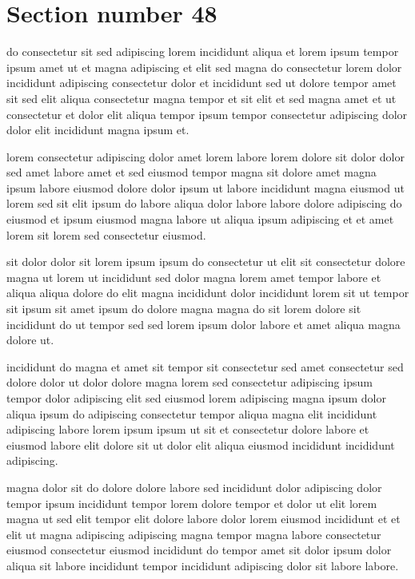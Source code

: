 \documentclass{article}
\begin{document}
\section{Section number 48}\label{sec:48}
do consectetur sit sed adipiscing lorem incididunt aliqua et lorem ipsum tempor ipsum amet ut et magna adipiscing et elit sed magna do consectetur lorem dolor incididunt adipiscing consectetur dolor et incididunt sed ut dolore tempor amet sit sed elit aliqua consectetur magna tempor et sit elit et sed magna amet et ut consectetur et dolor elit aliqua tempor ipsum tempor consectetur adipiscing dolor dolor elit incididunt magna ipsum et.

lorem consectetur adipiscing dolor amet lorem labore lorem dolore sit dolor dolor sed amet labore amet et sed eiusmod tempor magna sit dolore amet magna ipsum labore eiusmod dolore dolor ipsum ut labore incididunt magna eiusmod ut lorem sed sit elit ipsum do labore aliqua dolor labore labore dolore adipiscing do eiusmod et ipsum eiusmod magna labore ut aliqua ipsum adipiscing et et amet lorem sit lorem sed consectetur eiusmod.

sit dolor dolor sit lorem ipsum ipsum do consectetur ut elit sit consectetur dolore magna ut lorem ut incididunt sed dolor magna lorem amet tempor labore et aliqua aliqua dolore do elit magna incididunt dolor incididunt lorem sit ut tempor sit ipsum sit amet ipsum do dolore magna magna do sit lorem dolore sit incididunt do ut tempor sed sed lorem ipsum dolor labore et amet aliqua magna dolore ut.

incididunt do magna et amet sit tempor sit consectetur sed amet consectetur sed dolore dolor ut dolor dolore magna lorem sed consectetur adipiscing ipsum tempor dolor adipiscing elit sed eiusmod lorem adipiscing magna ipsum dolor aliqua ipsum do adipiscing consectetur tempor aliqua magna elit incididunt adipiscing labore lorem ipsum ipsum ut sit et consectetur dolore labore et eiusmod labore elit dolore sit ut dolor elit aliqua eiusmod incididunt incididunt adipiscing.

magna dolor sit do dolore dolore labore sed incididunt dolor adipiscing dolor tempor ipsum incididunt tempor lorem dolore tempor et dolor ut elit lorem magna ut sed elit tempor elit dolore labore dolor lorem eiusmod incididunt et et elit ut magna adipiscing adipiscing magna tempor magna labore consectetur eiusmod consectetur eiusmod incididunt do tempor amet sit dolor ipsum dolor aliqua sit labore incididunt tempor incididunt adipiscing dolor sit labore labore.
\end{document}
